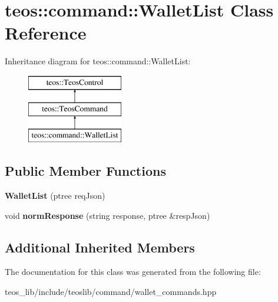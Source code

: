 \hypertarget{classteos_1_1command_1_1_wallet_list}{}\section{teos\+:\+:command\+:\+:Wallet\+List Class Reference}
\label{classteos_1_1command_1_1_wallet_list}
Inheritance diagram for teos\+:\+:command\+:\+:Wallet\+List\+:\begin{figure}[H]
\begin{center}
\leavevmode
\includegraphics[height=3.000000cm]{classteos_1_1command_1_1_wallet_list}
\end{center}
\end{figure}
\subsection*{Public Member Functions}
\begin{DoxyCompactItemize}
\item 
\mbox{\label{classteos_1_1command_1_1_wallet_list_a90c0173a82e45a1f1e1841b69a85a67c}} 
{\bfseries Wallet\+List} (ptree req\+Json)
\item 
\mbox{\label{classteos_1_1command_1_1_wallet_list_adb087e1fa5dc45ddcd7315709db44863}} 
void {\bfseries norm\+Response} (string response, ptree \&resp\+Json)
\end{DoxyCompactItemize}
\subsection*{Additional Inherited Members}


The documentation for this class was generated from the following file\+:\begin{DoxyCompactItemize}
\item 
teos\+\_\+lib/include/teoslib/command/wallet\+\_\+commands.\+hpp\end{DoxyCompactItemize}
